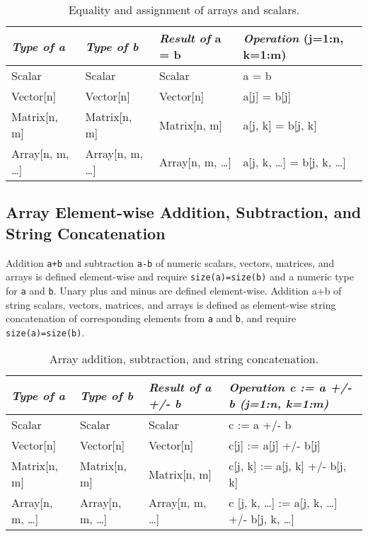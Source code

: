 \begin{longtable}[]{|l|l|l|l|}
\caption{Equality and assignment of arrays and scalars.}\\
\hline
\emph{Type of a} & \emph{Type of b} & \emph{Result of} a = b & \emph{Operation} (j=1:n, k=1:m)\\ \hline
\endhead
Scalar & Scalar & Scalar & a = b\\ \hline
Vector{[}n{]} & Vector{[}n{]} & Vector{[}n{]} & a{[}j{]} =
b{[}j{]}\\ \hline
Matrix{[}n, m{]} & Matrix{[}n, m{]} & Matrix{[}n, m{]} & a{[}j, k{]} =
b{[}j, k{]}\\ \hline
Array{[}n, m, \ldots{}{]} & Array{[}n, m, \ldots{}{]} & Array{[}n, m,
\ldots{}{]} & a{[}j, k, \ldots{}{]} = b{[}j, k,
\ldots{}{]}\\ \hline
\end{longtable}

\subsection{Array Element-wise Addition, Subtraction, and String Concatenation}

Addition \lstinline!a+b! and subtraction \lstinline!a-b! of numeric scalars, vectors, matrices,
and arrays is defined element-wise and require \lstinline!size(a)=size(b)! and a
numeric type for \lstinline!a! and \lstinline!b!. Unary plus and minus are defined element-wise.
Addition a+b of string scalars, vectors, matrices, and arrays is defined
as element-wise string concatenation of corresponding elements from \lstinline!a!
and \lstinline!b!, and require \lstinline!size(a)=size(b)!.

\begin{longtable}[]{|l|l|l|l|}
\caption{Array addition, subtraction, and string concatenation.}\\
\hline
\emph{Type of a} & \emph{Type of b} & \emph{Result of a +/- b} &
\emph{Operation c := a +/- b (j=1:n, k=1:m)}\\ \hline
\endhead
Scalar & Scalar & Scalar & c := a +/- b\\ \hline
Vector{[}n{]} & Vector{[}n{]} & Vector{[}n{]} & c{[}j{]} := a{[}j{]} +/-
b{[}j{]}\\ \hline
Matrix{[}n, m{]} & Matrix{[}n, m{]} & Matrix{[}n, m{]} & c{[}j, k{]} :=
a{[}j, k{]} +/- b{[}j, k{]}\\ \hline
Array{[}n, m, \ldots{}{]} & Array{[}n, m, \ldots{}{]} & Array{[}n, m,
\ldots{}{]} & c {[}j, k, \ldots{}{]} := a{[}j, k, \ldots{}{]} +/- b{[}j,
k, \ldots{}{]}\\ \hline
\end{longtable}

